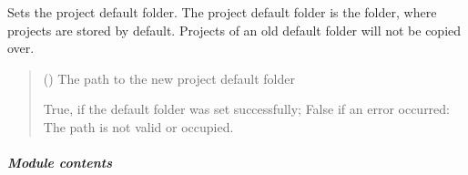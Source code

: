 \documentclass[letterpaper,10pt,english]{sphinxmanual}
\begin{document}
\begin{fulllineitems}
\begin{fulllineitems}
\begin{quote}
\begin{description}
\sphinxAtStartPar
{}

\end{description}\end{quote}

\end{fulllineitems}


\begin{fulllineitems}
\label{\detokenize{apidoc/src.osm_configurator.control:src.osm_configurator.control.settings_controller.SettingsController.set_project_default_folder}}
\pysigstartsignatures
{}
\pysigstopsignatures
\sphinxAtStartPar
Sets the project default folder.
The project default folder is the folder, where projects are stored by default.
Projects of an old default folder will not be copied over.
\begin{quote}\begin{description}
\sphinxAtStartPar
{} () \textendash{} The path to the new project default folder

\sphinxAtStartPar
True, if the default folder was set successfully; False if an error occurred: The path is not valid or occupied.

\sphinxAtStartPar
{}

\end{description}\end{quote}

\end{fulllineitems}


\end{fulllineitems}



\subparagraph{Module contents}
\label{\detokenize{apidoc/src.osm_configurator.control:module-src.osm_configurator.control}}\label{\detokenize{apidoc/src.osm_configurator.control:module-contents}}
\sphinxstepscope
\end{document}
